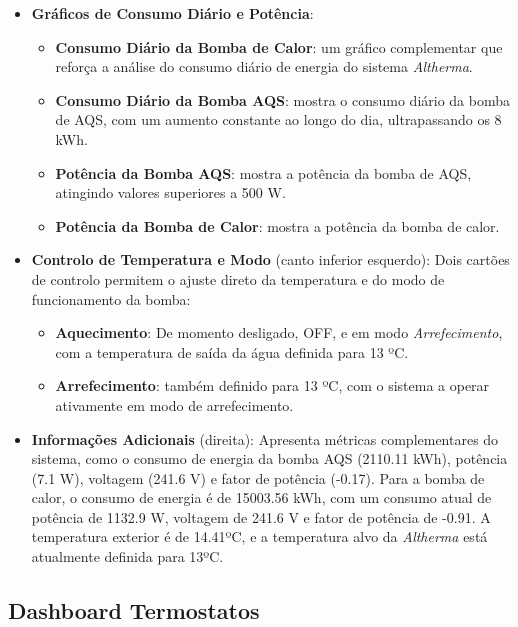 \begin{itemize}
    \item \textbf{Gráficos de Consumo Diário e Potência}:
    \begin{itemize}
        \item \textbf{Consumo Diário da Bomba de Calor}: um gráfico complementar que reforça a análise do consumo diário de energia do sistema \textit{Altherma}.
        \item \textbf{Consumo Diário da Bomba AQS}: mostra o consumo diário da bomba de AQS, com um aumento constante ao longo do dia, ultrapassando os 8 kWh.
        \item \textbf{Potência da Bomba AQS}: mostra a potência da bomba de AQS, atingindo valores superiores a 500 W.
        \item \textbf{Potência da Bomba de Calor}: mostra a potência da bomba de calor.
    \end{itemize}
    
    \item \textbf{Controlo de Temperatura e Modo} (canto inferior esquerdo): Dois cartões de controlo permitem o ajuste direto da temperatura e do modo de funcionamento da bomba:
    \begin{itemize}
        \item \textbf{Aquecimento}: De momento desligado, OFF, e em modo \textit{Arrefecimento}, com a temperatura de saída da água definida para 13 ºC.
        \item \textbf{Arrefecimento}: também definido para 13 ºC, com o sistema a operar ativamente em modo de arrefecimento.
    \end{itemize}
    
    \item \textbf{Informações Adicionais} (direita): Apresenta métricas complementares do sistema, como o consumo de energia da bomba AQS (2110.11 kWh), potência (7.1 W), voltagem (241.6 V) e fator de potência (-0.17). Para a bomba de calor, o consumo de energia é de 15003.56 kWh, com um consumo atual de potência de 1132.9 W, voltagem de 241.6 V e fator de potência de -0.91. A temperatura exterior é de 14.41ºC, e a temperatura alvo da \textit{Altherma} está atualmente definida para 13ºC.
\end{itemize}

\newpage

\subsection{Dashboard Termostatos}

